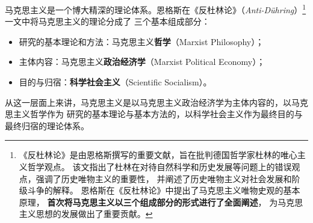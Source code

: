 \documentclass[11pt, UTF8]{book} %
\begin{document}
马克思主义是一个博大精深的理论体系。恩格斯在《反杜林论》（{\itshape Anti-Dühring}）\footnote{
    《反杜林论》是由恩格斯撰写的重要文献，旨在批判德国哲学家杜林的唯心主义哲学观点。
    该文指出了杜林在对待自然科学和历史发展等问题上的错误观点，强调了历史唯物主义的重要性，
    并阐述了历史唯物主义对社会发展和阶级斗争的解释。
    恩格斯在《反杜林论》中提出了马克思主义唯物史观的基本原理，
    \textbf{首次将马克思主义以三个组成部分的形式进行了全面阐述}，
    为马克思主义思想的发展做出了重要贡献。
}一文中将马克思主义的理论分成了
三个基本组成部分：
\begin{itemize}[itemsep=0pt]
    \item 研究的基本理论和方法：马克思主义\textbf{哲学}（Marxist Philosophy）；
    \item 主体内容：马克思主义\textbf{政治经济学}（Marxist Political Economy）；
    \item 目的与归宿：\textbf{科学社会主义}（Scientific Socialism）。
\end{itemize}
从这一层面上来讲，马克思主义是以马克思主义政治经济学为主体内容的，以马克思主义哲学作为
研究的基本理论与基本方法的，以科学社会主义作为最终目的与最终归宿的理论体系。
\end{document}
